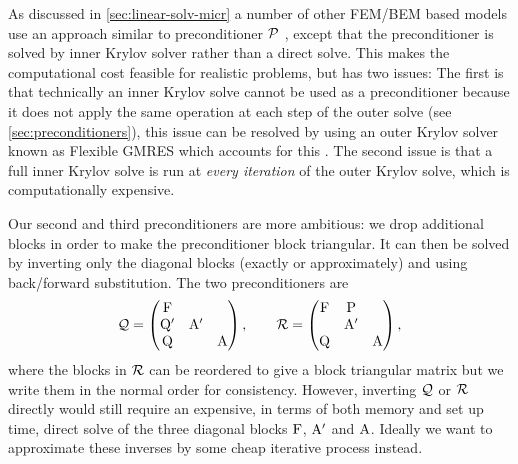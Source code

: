 As discussed in \cref{sec:linear-solv-micr} a number of other FEM/BEM based models use an approach similar to preconditioner $\mathcal{P}$ \cite{Suess2002}, except that the preconditioner is solved by inner Krylov solver rather than a direct solve.
This makes the computational cost feasible for realistic problems, but has two issues:
The first is that technically an inner Krylov solve cannot be used as a preconditioner because it does not apply the same operation at each step of the outer solve (see \cref{sec:preconditioners}), this issue can be resolved by using an outer Krylov solver known as Flexible GMRES which accounts for this \cite{Saad1993}.
The second issue is that a full inner Krylov solve is run at \emph{every iteration} of the outer Krylov solve, which is computationally expensive.

Our second and third preconditioners are more ambitious: we drop additional blocks in order to make the preconditioner block triangular.
It can then be solved by inverting only the diagonal blocks (exactly or approximately) and using back/forward substitution.
The two preconditioners are
\begin{equation}
  \mathcal{Q} =
  \begin{pmatrix}
    \mathrm{F}       &           &  \\
    \mathrm{Q}'       & \mathrm{A}'&   \\
    \mathrm{Q}       &           &   \mathrm{A}
  \end{pmatrix},
  \qquad
  \mathcal{R} =
  \begin{pmatrix}
    \mathrm{F}       & \mathrm{P}       &  \\
    & \mathrm{A}' &   \\
    \mathrm{Q}       &           &   \mathrm{A}
  \end{pmatrix},
  \label{eq:ms-block-prec-drop-p}
\end{equation}
where the blocks in $\mathcal{R}$ can be reordered to give a block triangular matrix but we write them in the normal order for consistency.
However, inverting $\mathcal{Q}$ or $\mathcal{R}$ directly would still require an expensive, in terms of both memory and set up time, direct solve of the three diagonal blocks $\mathrm{F}$, $\mathrm{A}'$ and $\mathrm{A}$.
Ideally we want to approximate these inverses by some cheap iterative process instead.


